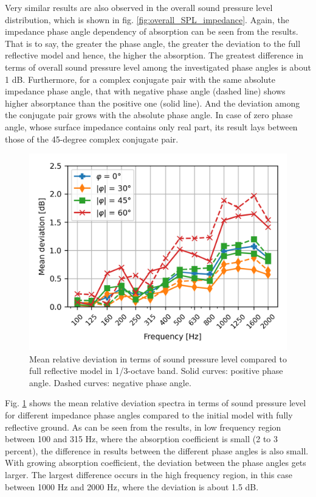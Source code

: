 Very similar results are also observed in the overall sound pressure level distribution, which is shown in fig. \ref{fig:overall_SPL_impedance}. Again, the impedance phase angle dependency of absorption can be seen from the results. That is to say, the greater the phase angle, the greater the deviation to the full reflective model and hence, the higher the absorption. The greatest difference in terms of overall sound pressure level among the investigated phase angles is about 1 dB. Furthermore, for a complex conjugate pair with the same absolute impedance phase angle, that with negative phase angle (dashed line) shows higher absorptance than the positive one (solid line). And the deviation among the conjugate pair grows with the absolute phase angle. In case of zero phase angle, whose surface impedance contains only real part, its result lays between those of the 45-degree complex conjugate pair.

\begin{figure}[H]
	\centering
	\includegraphics[width=0.7\linewidth]{fig/chap5/impedance/freq_spectrum/average_gap.png}
	\caption{Mean relative deviation in terms of sound pressure level compared to full reflective model in 1/3-octave band. Solid curves: positive phase angle. Dashed curves: negative phase angle.}
	\label{fig:gap_freq_spectrum_impedance}
\end{figure}

Fig. \ref{fig:gap_freq_spectrum_impedance} shows the mean relative deviation spectra in terms of sound pressure level for different impedance phase angles compared to the initial model with fully reflective ground. As can be seen from the results, in low frequency region between 100 and 315 Hz, where the absorption coefficient is small (2 to 3 percent), the difference in results between the different phase angles is also small. With growing absorption coefficient, the deviation between the phase angles gets larger. The largest difference occurs in the high frequency region, in this case between 1000 Hz and 2000 Hz, where the deviation is about 1.5 dB.

